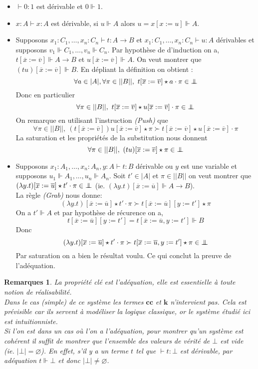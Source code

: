 \documentclass[a4paper,12pt]{article}
\theoremstyle{rmqstyle}
\newtheorem{rmqs}[theo]{Remarques}
\newcommand{\abs}[1]{\lvert#1\rvert}
\newcommand{\abss}[1]{\lvert \lvert#1\rvert \rvert}
\newcommand{\cc}{\mathbf{cc}}
\renewcommand{\k}{\mathbf{k}}
\newcommand{\pole}{{\protect\mathpalette{\protect\polehelper}{\bot}}} \def\polehelper#1#2{\mathrel{\rlap{$#1#2$}\mkern3mu{#1#2}}}
\renewcommand{\bar}{\overline}
\begin{document}
\begin{itemize}
\setlength\itemsep{ -1 em}
\item $\vdash 0 : 1$ est dérivable et $0 \Vdash 1$.\\

\item $x : A \vdash x :A$ est dérivable, si $u \Vdash A$ alors $u = x[x := u] \Vdash A$.\\

\item Supposons $x_1 : C_1, \dots, x_n : C_n \vdash t : A \to B$ et $x_1 : C_1, \dots, x_n : C_n \vdash u : A$ dérivables et supposons $v_1 \Vdash C_1, \dots, v_n \Vdash C_n$. Par hypothèse de d'induction on a, $t[ \bar{x} := \bar{v}] \Vdash A \to B$ et $u[\bar{x} := \bar{v}] \Vdash A$. On veut montrer que $(tu)[\bar{x} := \bar{v}] \Vdash B$. En dépliant la définition on obtient : 
$$\forall a \in \abs{A}, \forall \pi \in \abss{B}, \ t[\bar{x} := \bar{v}] \star a \cdot \pi \in \pole$$
Donc en particulier
$$ \forall \pi \in \abss{B}, \ t[\bar{x} := \bar{v}] \star u[\bar{x} := \bar{v}] \cdot \pi \in \pole$$
On remarque en utilisant l'instruction \textit{(Push)} que 
$$\forall \pi \in \abss{B}, \ (t[\bar{x} := \bar{v}])u[\bar{x} := \bar{v}] \star \pi \succ t[\bar{x} := \bar{v}] \star u[\bar{x} := \bar{v}] \cdot \pi$$
La saturation et les propriétés de la substitution nous donnent 
$$\forall \pi \in \abss{B}, \ (tu)[\bar{x} := \bar{v}] \star \pi \in \pole$$

\item Supposons $x_1 : A_1, \dots, x_n : A_n, y : A \vdash t : B$ dérivable ou $y$ est une variable et supposons $u_1 \Vdash A_1, \dots, u_n \Vdash A_n$. Soit $t' \in \abs{A}$ et $\pi \in \abss{B}$ on veut montrer que $(\lambda y.t)[\bar{x} := \bar{u}] \star t' \cdot \pi \in \pole$ (ie. $(\lambda y.t)[\bar{x} := \bar{u}] \Vdash A \to B$).\\
La règle \textit{(Grab)} nous donne:
$$(\lambda y.t)[\bar{x} := \bar{u}] \star t' \cdot \pi \succ  t[\bar{x} := \bar{u}][y := t'] \star \pi $$
On a $t' \Vdash A$ et par hypothèse de récurence on a,
$$t[\bar{x} := \bar{u}][y := t'] = t[\bar{x} := \bar{u}, y := t'] \Vdash B$$
Donc
$$(\lambda y.t)[\bar{x} := \bar{u}] \star t' \cdot \pi \succ  t[\bar{x} := \bar{u}, y := t'] \star \pi \in \pole$$
Par saturation on a bien le résultat voulu. Ce qui conclut la preuve de l'adéquation.
\end{itemize}

\begin{rmqs} La propriété clé est l'adéquation, elle est essentielle à toute notion de réalisabilité.\\
Dans le cas (simple) de ce système les termes $\cc$ et $\k$ n'intervient pas. Cela est prévisible car ils servent à modéliser la logique classique, or le système étudié ici est intuitionniste.\\
Si l'on est dans un cas où l'on a l'adéquation, pour montrer qu'un système est cohérent il suffit de montrer que l'ensemble des valeurs de vérité de $\bot$ est vide (ie. $\abs{\bot} = \varnothing$). En effet, s'il y a un terme $t$ tel que $\vdash t : \bot$ est dérivable, par adéquation $t \Vdash \bot$ et donc $\abs{\bot} \neq \varnothing$. 
\end{rmqs}
\end{document}
